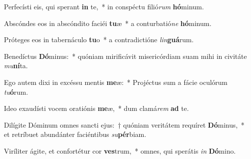 \item Perfecísti eis, qui sperant \textbf{in} te,~* in conspéctu filió\textit{rum} \textbf{hó}minum.
\item Abscóndes eos in abscóndito faciéi \textbf{tu}æ~* a conturbatió\textit{ne} \textbf{hó}minum.
\item Próteges eos in tabernáculo \textbf{tu}o~* a contradictióne \textit{lin}\textbf{guá}rum.
\item Benedíctus \textbf{Dó}minus:~* quóniam mirificávit misericórdiam suam mihi in civitáte \textit{mu}\textbf{ní}ta.
\item Ego autem dixi in excéssu mentis \textbf{me}æ:~* Projéctus sum a fácie oculórum \textit{tu}\textbf{ó}rum.
\item Ideo exaudísti vocem oratiónis \textbf{me}æ,~* dum clamá\textit{rem} \textbf{ad} te.
\item Dilígite Dóminum omnes sancti ejus:~† quóniam veritátem requíret \textbf{Dó}minus,~* et retríbuet abundánter faciéntibus \textit{su}\textbf{pér}biam.
\item Viríliter ágite, et confortétur cor \textbf{ves}trum,~* omnes, qui sperátis \textit{in} \textbf{Dó}mino.
